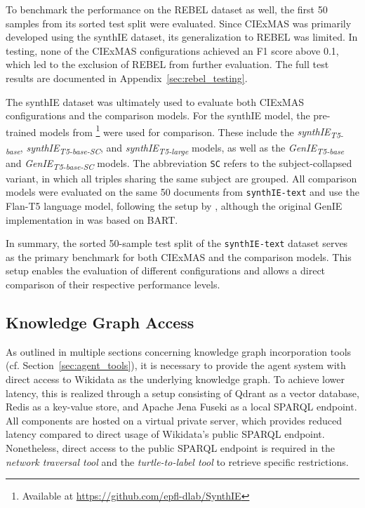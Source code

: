 \documentclass[a4paper,oneside,bibliography=totoc]{scrbook}
\begin{document}
To benchmark the performance on the REBEL dataset as well, the first 50 samples from its sorted test split were evaluated. Since CIExMAS was primarily developed using the synthIE dataset, its generalization to REBEL was limited. In testing, none of the CIExMAS configurations achieved an F1 score above 0.1, which led to the exclusion of REBEL from further evaluation. The full test results are documented in Appendix~\ref{sec:rebel_testing}.

The synthIE dataset was ultimately used to evaluate both CIExMAS configurations and the comparison models. For the synthIE model, the pre-trained models from \citet{Josifoski2023}\footnote{Available at \url{https://github.com/epfl-dlab/SynthIE}} were used for comparison. These include the \textit{synthIE\textsubscript{T5-base}}, \textit{synthIE\textsubscript{T5-base-SC}}, and \textit{synthIE\textsubscript{T5-large}} models, as well as the \textit{GenIE\textsubscript{T5-base}} and \textit{GenIE\textsubscript{T5-base-SC}} models. The abbreviation \texttt{SC} refers to the subject-collapsed variant, in which all triples sharing the same subject are grouped. All comparison models were evaluated on the same 50 documents from \texttt{synthIE-text} and use the Flan-T5 language model, following the setup by \citet{Josifoski2023}, although the original GenIE implementation in \citet{Josifoski2021} was based on BART.

In summary, the sorted 50-sample test split of the \texttt{synthIE-text} dataset serves as the primary benchmark for both CIExMAS and the comparison models. This setup enables the evaluation of different configurations and allows a direct comparison of their respective performance levels.

\subsection{Knowledge Graph Access}
\label{subsec:knowledge_graph_access}

As outlined in multiple sections concerning knowledge graph incorporation tools (cf. Section~\ref{sec:agent_tools}), it is necessary to provide the agent system with direct access to Wikidata as the underlying knowledge graph. To achieve lower latency, this is realized through a setup consisting of Qdrant as a vector database, Redis as a key-value store, and Apache Jena Fuseki as a local \ac{SPARQL} endpoint. All components are hosted on a virtual private server, which provides reduced latency compared to direct usage of Wikidata’s public \ac{SPARQL} endpoint. Nonetheless, direct access to the public \ac{SPARQL} endpoint is required in the \textit{network traversal tool} and the \textit{turtle-to-label tool} to retrieve specific restrictions.
\end{document}
